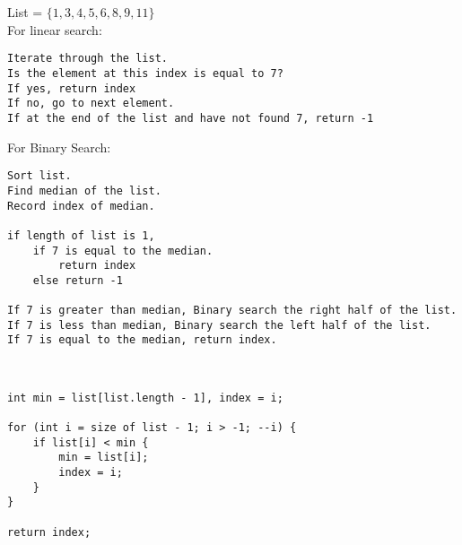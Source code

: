 \documentclass[12pt]{article}  %
\begin{document}
\\
\\
List = $\{1,3,4,5,6,8,9,11\}$\\
For linear search:
\begin{verbatim}
Iterate through the list.
Is the element at this index is equal to 7?
If yes, return index
If no, go to next element.
If at the end of the list and have not found 7, return -1
\end{verbatim}
For Binary Search:
\begin{verbatim}
Sort list.
Find median of the list.
Record index of median.

if length of list is 1,
    if 7 is equal to the median.
        return index
    else return -1

If 7 is greater than median, Binary search the right half of the list.
If 7 is less than median, Binary search the left half of the list.
If 7 is equal to the median, return index.
\end{verbatim}

\\
\begin{verbatim}
int min = list[list.length - 1], index = i;

for (int i = size of list - 1; i > -1; --i) {
    if list[i] < min {
        min = list[i];
        index = i;
    }
}

return index;
\end{verbatim}
\end{document}
